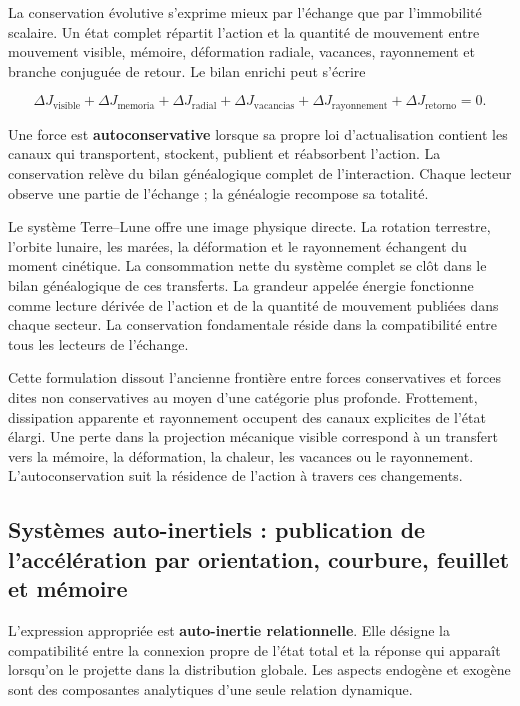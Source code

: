 La conservation évolutive s'exprime mieux par l'échange que par l'immobilité scalaire. Un état complet répartit l'action et la quantité de mouvement entre mouvement visible, mémoire, déformation radiale, vacances, rayonnement et branche conjuguée de retour. Le bilan enrichi peut s'écrire

\[
\Delta J_{\mathrm{visible}}
+\Delta J_{\mathrm{memoria}}
+\Delta J_{\mathrm{radial}}
+\Delta J_{\mathrm{vacancias}}
+\Delta J_{\text{rayonnement}}
+\Delta J_{\mathrm{retorno}}
=0.
\]

Une force est \textbf{autoconservative} lorsque sa propre loi d'actualisation contient les canaux qui transportent, stockent, publient et réabsorbent l'action. La conservation relève du bilan généalogique complet de l'interaction. Chaque lecteur observe une partie de l'échange ; la généalogie recompose sa totalité.

Le système Terre–Lune offre une image physique directe. La rotation terrestre, l'orbite lunaire, les marées, la déformation et le rayonnement échangent du moment cinétique. La consommation nette du système complet se clôt dans le bilan généalogique de ces transferts. La grandeur appelée énergie fonctionne comme lecture dérivée de l'action et de la quantité de mouvement publiées dans chaque secteur. La conservation fondamentale réside dans la compatibilité entre tous les lecteurs de l'échange.

Cette formulation dissout l'ancienne frontière entre forces conservatives et forces dites non conservatives au moyen d'une catégorie plus profonde. Frottement, dissipation apparente et rayonnement occupent des canaux explicites de l'état élargi. Une perte dans la projection mécanique visible correspond à un transfert vers la mémoire, la déformation, la chaleur, les vacances ou le rayonnement. L'autoconservation suit la résidence de l'action à travers ces changements.

\subsection{Systèmes auto-inertiels : publication de l'accélération par orientation, courbure, feuillet et mémoire}

L'expression appropriée est \textbf{auto-inertie relationnelle}. Elle désigne la compatibilité entre la connexion propre de l'état total et la réponse qui apparaît lorsqu'on le projette dans la distribution globale. Les aspects endogène et exogène sont des composantes analytiques d'une seule relation dynamique.

